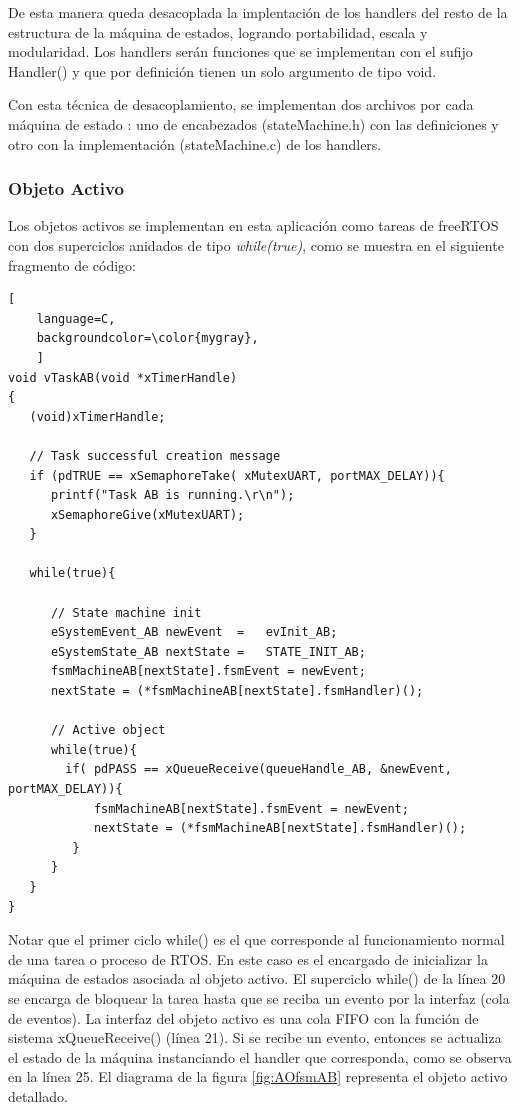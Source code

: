 De esta manera queda desacoplada la implentación de los handlers del resto de la estructura de la máquina de estados, logrando portabilidad, escala y modularidad. Los handlers serán funciones que se implementan con el sufijo Handler() y que por definición tienen un solo argumento de tipo void.

Con esta técnica de desacoplamiento, se implementan dos archivos por cada máquina de estado : uno de encabezados (stateMachine.h) con las definiciones y otro con la implementación (stateMachine.c) de los handlers.




\subsubsection{Objeto Activo}
	
Los objetos activos se implementan en esta aplicación como tareas de freeRTOS con dos superciclos anidados de tipo \textit{while(true)}, como se muestra en el siguiente fragmento de código: 

\begin{lstlisting}[
	language=C, 
	backgroundcolor=\color{mygray},
	]
void vTaskAB(void *xTimerHandle)
{
   (void)xTimerHandle;

   // Task successful creation message
   if (pdTRUE == xSemaphoreTake( xMutexUART, portMAX_DELAY)){
      printf("Task AB is running.\r\n");
      xSemaphoreGive(xMutexUART);
   }

   while(true){
      
      // State machine init
      eSystemEvent_AB newEvent	=	evInit_AB;
      eSystemState_AB nextState	=	STATE_INIT_AB;
      fsmMachineAB[nextState].fsmEvent = newEvent; 
      nextState = (*fsmMachineAB[nextState].fsmHandler)();

      // Active object
      while(true){
        if( pdPASS == xQueueReceive(queueHandle_AB, &newEvent, portMAX_DELAY)){
            fsmMachineAB[nextState].fsmEvent = newEvent; 
            nextState = (*fsmMachineAB[nextState].fsmHandler)();
         }
      }
   }
}
\end{lstlisting}

Notar que el primer ciclo while() es el que corresponde al funcionamiento normal de una tarea o proceso de RTOS. En este caso es el encargado de inicializar la máquina de estados asociada al objeto activo. El superciclo while() de la línea 20 se encarga de bloquear la tarea hasta que se reciba un evento por la interfaz (cola de eventos). La interfaz del objeto activo es una cola FIFO con la función de sistema xQueueReceive() (línea 21). Si se recibe un evento, entonces se actualiza el estado de la máquina instanciando el handler que corresponda, como se observa en la línea 25. El diagrama de la figura \ref{fig:AOfsmAB} representa el objeto activo detallado. 

